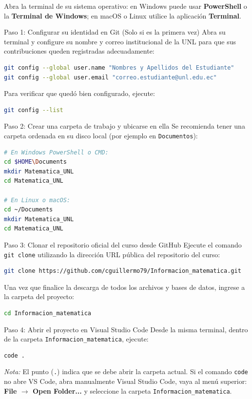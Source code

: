 \documentclass[11pt,a4paper]{article}
\begin{document}
Abra la terminal de su sistema operativo: en Windows puede usar \textbf{PowerShell} o la \textbf{Terminal de Windows}; en macOS o Linux utilice la aplicación \textbf{Terminal}.

\begin{stepbox}{Paso 1: Configurar su identidad en Git (Solo si es la primera vez)}
Abra su terminal y configure su nombre y correo institucional de la UNL para que sus contribuciones queden registradas adecuadamente:
\begin{lstlisting}[language=bash]
git config --global user.name "Nombres y Apellidos del Estudiante"
git config --global user.email "correo.estudiante@unl.edu.ec"
\end{lstlisting}
Para verificar que quedó bien configurado, ejecute:
\begin{lstlisting}[language=bash]
git config --list
\end{lstlisting}
\end{stepbox}

\begin{stepbox}{Paso 2: Crear una carpeta de trabajo y ubicarse en ella}
Se recomienda tener una carpeta ordenada en su disco local (por ejemplo en \texttt{Documentos}):
\begin{lstlisting}[language=bash]
# En Windows PowerShell o CMD:
cd $HOME\Documents
mkdir Matematica_UNL
cd Matematica_UNL

# En Linux o macOS:
cd ~/Documents
mkdir Matematica_UNL
cd Matematica_UNL
\end{lstlisting}
\end{stepbox}

\begin{stepbox}{Paso 3: Clonar el repositorio oficial del curso desde GitHub}
Ejecute el comando \texttt{git clone} utilizando la dirección URL pública del repositorio del curso:
\begin{lstlisting}[language=bash]
git clone https://github.com/cguillermo79/Informacion_matematica.git
\end{lstlisting}
Una vez que finalice la descarga de todos los archivos y bases de datos, ingrese a la carpeta del proyecto:
\begin{lstlisting}[language=bash]
cd Informacion_matematica
\end{lstlisting}
\end{stepbox}

\begin{stepbox}{Paso 4: Abrir el proyecto en Visual Studio Code}
Desde la misma terminal, dentro de la carpeta \texttt{Informacion\_matematica}, ejecute:
\begin{lstlisting}[language=bash]
code .
\end{lstlisting}
\textit{Nota:} El punto (\texttt{.}) indica que se debe abrir la carpeta actual. Si el comando \texttt{code} no abre VS Code, abra manualmente Visual Studio Code, vaya al menú superior: \textbf{File $\rightarrow$ Open Folder...} y seleccione la carpeta \texttt{Informacion\_matematica}.
\end{stepbox}
\end{document}
